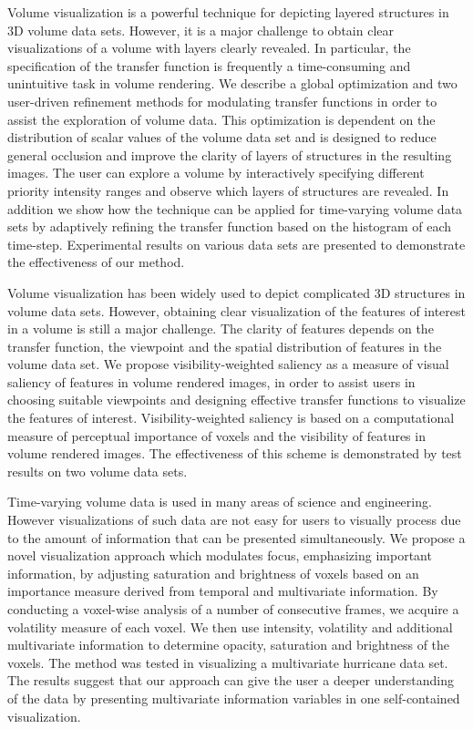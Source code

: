 \documentclass[a4paper, 12pt, oneside]{report}         %
\begin{document}
\begin{thesisabstract}
Volume visualization is a powerful technique for depicting layered structures in 3D volume data sets. However, it is a major challenge to obtain clear visualizations of a volume with layers clearly revealed.
In particular, the specification of the transfer function is frequently a time-consuming and unintuitive task in volume rendering.
We describe a global optimization and two user-driven refinement methods for modulating transfer functions in order to assist the exploration of volume data.
This optimization is dependent on the distribution of scalar values of the volume data set and is designed to reduce general occlusion and improve the clarity of layers of structures in the resulting images.
The user can explore a volume by interactively specifying different priority intensity ranges and observe which layers of structures are revealed. In addition we show how the technique can be applied for time-varying volume data sets by adaptively refining the transfer function based on the histogram of each time-step. 
Experimental results on various data sets are presented to demonstrate the effectiveness of our method.


Volume visualization has been widely used to depict complicated 3D structures in volume data sets.
However, obtaining clear visualization of the features of interest in a volume is still a major challenge.
The clarity of features depends on the transfer function, the viewpoint and the spatial distribution of features in the volume data set.
We propose visibility-weighted saliency as a measure of visual saliency of features in volume rendered images, in order to assist users in choosing suitable viewpoints and designing effective transfer functions to visualize the features of interest. Visibility-weighted saliency is based on a computational measure of perceptual importance of voxels and the visibility of features in volume rendered images.
The effectiveness of this scheme is demonstrated by test results on two volume data sets.


Time-varying volume data is used in many areas of science and engineering. However visualizations of such data are not easy for users to visually process due to the amount of information that can be presented simultaneously. We propose a novel visualization approach which modulates focus, emphasizing important information, by adjusting saturation and brightness of voxels based on an importance measure derived from temporal and multivariate information. By conducting a voxel-wise analysis of a number of consecutive frames, we acquire a volatility measure of each voxel. We then use intensity, volatility and additional multivariate information to determine opacity, saturation and brightness of the voxels. The method was tested in visualizing a multivariate hurricane data set. The results suggest that our approach can give the user a deeper understanding of the data by presenting multivariate information variables in one self-contained visualization.
\end{thesisabstract}
\end{document}
